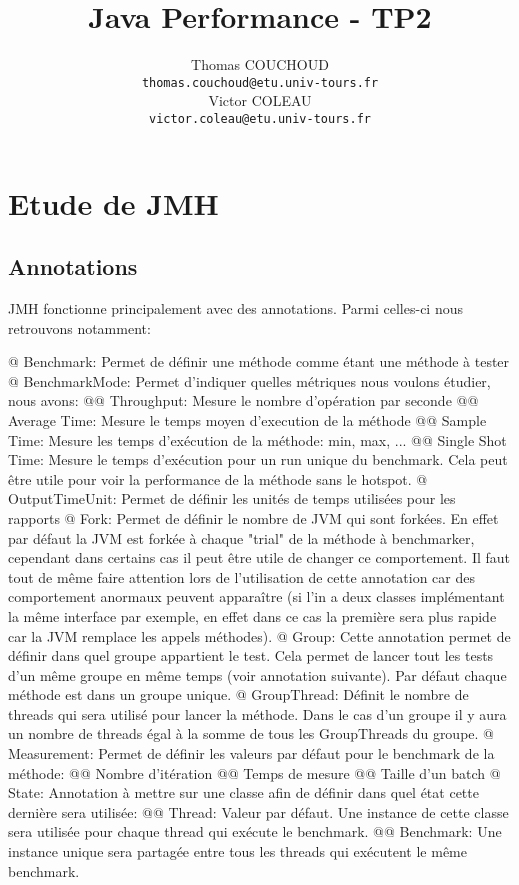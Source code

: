 \documentclass{report}
\title{Java Performance - TP2}
\author{Thomas COUCHOUD\\\texttt{thomas.couchoud@etu.univ-tours.fr}\\Victor COLEAU\\\texttt{victor.coleau@etu.univ-tours.fr}}
\begin{document}
	\mccTitle
	
	\chapter{Etude de JMH}
		\section{Annotations}
			JMH fonctionne principalement avec des annotations.
			Parmi celles-ci nous retrouvons notamment:
			\begin{easylist}[itemize]
				@ Benchmark: Permet de définir une méthode comme étant une méthode à tester
				@ BenchmarkMode: Permet d'indiquer quelles métriques nous voulons étudier, nous avons:
				@@ Throughput: Mesure le nombre d'opération par seconde
				@@ Average Time: Mesure le temps moyen d'execution de la méthode
				@@ Sample Time: Mesure les temps d'exécution de la méthode: min, max, ...
				@@ Single Shot Time: Mesure le temps d'exécution pour un run unique du benchmark.
				Cela peut être utile pour voir la performance de la méthode sans le hotspot.
				@ OutputTimeUnit: Permet de définir les unités de temps utilisées pour les rapports
				@ Fork: Permet de définir le nombre de JVM qui sont forkées.
				En effet par défaut la JVM est forkée à chaque "trial" de la méthode à benchmarker, cependant dans certains cas il peut être utile de changer ce comportement.
				Il faut tout de même faire attention lors de l'utilisation de cette annotation car des comportement anormaux peuvent apparaître (si l'in a deux classes implémentant la même interface par exemple, en effet dans ce cas la première sera plus rapide car la JVM remplace les appels méthodes).
				@ Group: Cette annotation permet de définir dans quel groupe appartient le test.
				Cela permet de lancer tout les tests d'un même groupe en même temps (voir annotation suivante).
				Par défaut chaque méthode est dans un groupe unique.
				@ GroupThread: Définit le nombre de threads qui sera utilisé pour lancer la méthode.
				Dans le cas d'un groupe il y aura un nombre de threads égal à la somme de tous les GroupThreads du groupe.
				@ Measurement: Permet de définir les valeurs par défaut pour le benchmark de la méthode:
				@@ Nombre d'itération
				@@ Temps de mesure
				@@ Taille d'un batch
				@ State: Annotation à mettre sur une classe afin de définir dans quel état cette dernière sera utilisée:
				@@ Thread: Valeur par défaut. Une instance de cette classe sera utilisée pour chaque thread qui exécute le benchmark.
				@@ Benchmark: Une instance unique sera partagée entre tous les threads qui exécutent le même benchmark. 

\end{easylist}
\end{document}
